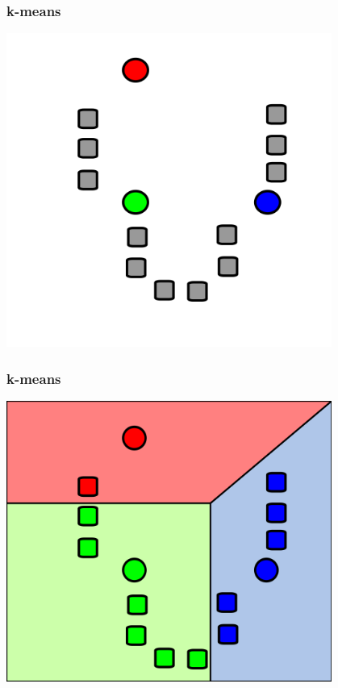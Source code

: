 \documentclass{beamer}
\begin{document}
\begin{frame}
\frametitle{k-means}
\begin{center}
\includegraphics[width=0.8\textwidth]{km1.png}
\end{center}
\end{frame}

\begin{frame}
\frametitle{k-means}
\begin{center}
\includegraphics[width=0.8\textwidth]{km2.png}
\end{center}
\end{frame}
\end{document}

